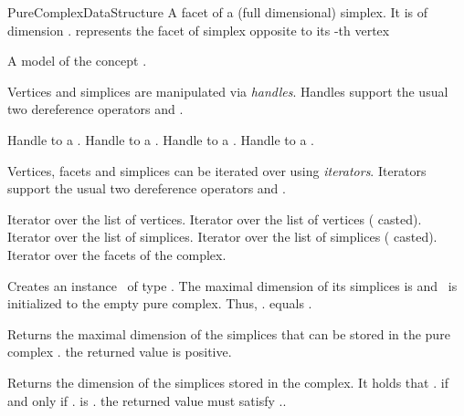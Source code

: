 \begin{ccRefConcept}{PureComplexDataStructure}
{A facet of a (full dimensional) simplex. It is of dimension
.  represents the facet of
simplex  opposite to its -th vertex}

{A model of the concept .}

Vertices and simplices are manipulated via \emph{handles}. Handles support the
usual two dereference operators  and .

{
Handle to a .
}
\ccGlue
{}
{
Handle to a .
}
\ccGlue
{}
{
Handle to a .
}
\ccGlue
{}
{
Handle to a .
}

Vertices, facets and simplices can be iterated over using \emph{iterators}.
Iterators support the usual two dereference operators  and
.

{
Iterator over the list of vertices.
}
\ccGlue
{}
{
Iterator over the list of vertices ( casted).
}
\ccGlue
{}
{
Iterator over the list of simplices.
}
\ccGlue
{}
{
Iterator over the list of simplices ( casted).
}
\ccGlue
{}
{
Iterator over the facets of the complex.
}


\ccCreation
{}

 { Creates an instance \ccVar\ of
type \ccRefName. The maximal dimension of its simplices is  and
\ccVar\ is initialized to the empty pure complex. Thus,
\ccVar. equals .}



 { Returns the maximal dimension of
the simplices that can be stored in the pure complex \ccVar. \ccPostcond the
returned value is positive. }

 { Returns the dimension of the
simplices stored in the complex. It holds that
\ccVar. if and only if \ccVar. is
. \ccPostcond the returned value  must satisfy \ccVar.. }


\end{ccRefConcept}

